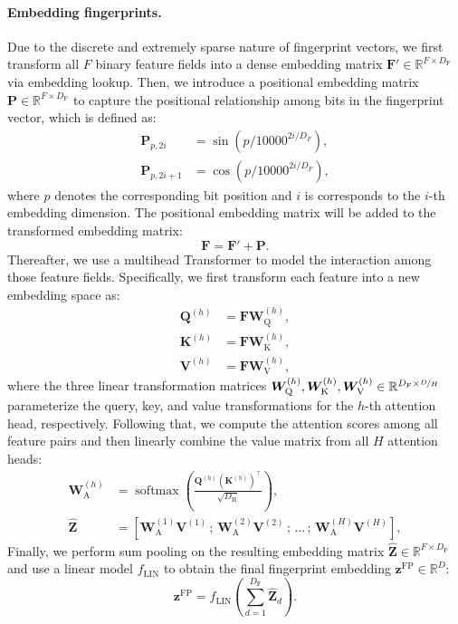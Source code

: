 \paragraph{Embedding fingerprints.}
Due to the discrete and extremely sparse nature of fingerprint vectors, we first transform all \(F\) binary feature fields into a dense embedding matrix \(\bm{F}' \in \mathbb{R}^{F \times D_\text{F}}\) via embedding lookup.
Then, we introduce a positional embedding matrix \(\bm{P} \in \mathbb{R}^{F \times D_\text{F}}\) to capture the positional relationship among bits in the fingerprint vector, which is defined as:
\begin{align}
	\bm{P}_{p, 2i} &= \sin(p/10000^{2i/D_F}),\\
	\bm{P}_{p, 2i+1} &= \cos(p/10000^{2i/D_F}),
\end{align}
where \(p\) denotes the corresponding bit position and \(i\) is corresponds to the \(i\)-th embedding dimension.
The positional embedding matrix will be added to the transformed embedding matrix:
\begin{equation}
	\bm{F} = \bm{F}' + \bm{P}.
\end{equation}
Thereafter, we use a multihead Transformer \cite{Vaswani:2017ul} to model the interaction among those feature fields.
Specifically, we first transform each feature into a new embedding space as:
\begin{align}
	\bm{Q}^{(h)} & = \bm{F}\bm{W}_\text{Q}^{(h)}, \\
	\bm{K}^{(h)} & = \bm{F}\bm{W}_\text{K}^{(h)}, \\
	\bm{V}^{(h)} & = \bm{F}\bm{W}_\text{V}^{(h)},
\end{align}
where the three linear transformation matrices \(\bm{W}_\text{Q}^{(h)}, \bm{W}_\text{K}^{(h)}, \bm{W}_\text{V}^{(h)} \in \mathbb{R}^{D_\text{F} \times \nicefrac{D}{H}}\) parameterize the query, key, and value transformations for the \(h\)-th attention head, respectively.
Following that, we compute the attention scores among all feature pairs and then linearly combine the value matrix from all \(H\) attention heads:
\begin{align}
	\bm{W}_\text{A}^{(h)} & = \operatorname{softmax}\left(\frac{\bm{Q}^{(h)}(\bm{K}^{(h)})^\top}{\sqrt{D_\text{H}}}\right), \\
	\widehat{\bm{Z}} & = \left[\bm{W}_\text{A}^{(1)}\bm{V}^{(1)} \,;\, \bm{W}_\text{A}^{(2)}\bm{V}^{(2)} \,;\, \dots \,;\, \bm{W}_\text{A}^{(H)}\bm{V}^{(H)} \right],
\end{align}
Finally, we perform sum pooling on the resulting embedding matrix \(\widehat{\bm{Z}} \in \mathbb{R}^{F \times D_\text{F}}\) and use a linear model \(f_\text{LIN}\) to obtain the final fingerprint embedding \(\bm{z}^\text{FP} \in \mathbb{R}^{D}\):
\begin{equation}
	\bm{z}^\text{FP} = f_\text{LIN} \left(\sum_{d=1}^{D_\text{F}} \widehat{\bm{Z}}_{d}\right).
\end{equation}

